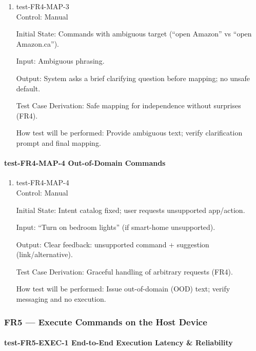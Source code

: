 \documentclass[12pt, titlepage]{article}
\begin{document}
\begin{enumerate}
\item{test-FR4-MAP-3\\}
Control: Manual

Initial State: Commands with ambiguous target (“open Amazon” vs “open Amazon.ca”).

Input: Ambiguous phrasing.

Output: System asks a brief clarifying question before mapping; no unsafe default.

Test Case Derivation: Safe mapping for independence without surprises (FR4).

How test will be performed: Provide ambiguous text; verify clarification prompt and final mapping.
\end{enumerate}

\paragraph{test-FR4-MAP-4 Out-of-Domain Commands}

\begin{enumerate}
\item{test-FR4-MAP-4\\}
Control: Manual

Initial State: Intent catalog fixed; user requests unsupported app/action.

Input: “Turn on bedroom lights” (if smart-home unsupported).

Output: Clear feedback: unsupported command + suggestion (link/alternative).

Test Case Derivation: Graceful handling of arbitrary requests (FR4).

How test will be performed: Issue out-of-domain (OOD) text; verify messaging and no execution.
\end{enumerate}

\subsubsection{FR5 — Execute Commands on the Host Device}

\paragraph{test-FR5-EXEC-1 End-to-End Execution Latency \& Reliability}
\end{document}
